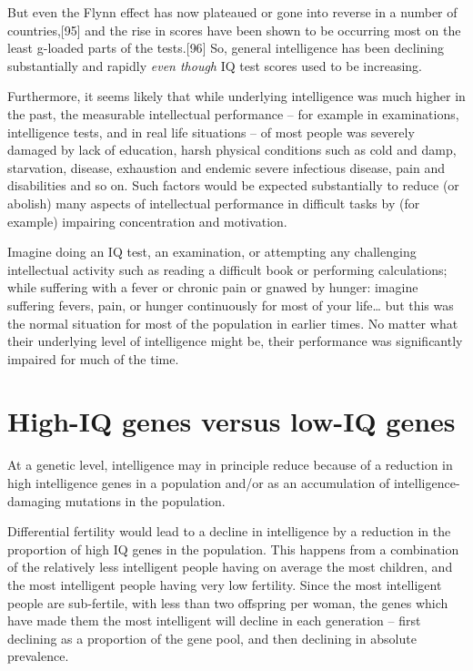 \documentclass[
]{book}
\begin{document}
But even the Flynn effect has now plateaued or gone into reverse in a number of countries,{[}95{]} and the rise in scores have been shown to be occurring most on the least g-loaded parts of the tests.{[}96{]} So, general intelligence has been declining substantially and rapidly \emph{even though} IQ test scores used to be increasing.

Furthermore, it seems likely that while underlying intelligence was much higher in the past, the measurable intellectual performance -- for example in examinations, intelligence tests, and in real life situations -- of most people was severely damaged by lack of education, harsh physical conditions such as cold and damp, starvation, disease, exhaustion and endemic severe infectious disease, pain and disabilities and so on. Such factors would be expected substantially to reduce (or abolish) many aspects of intellectual performance in difficult tasks by (for example) impairing concentration and motivation.

Imagine doing an IQ test, an examination, or attempting any challenging intellectual activity such as reading a difficult book or performing calculations; while suffering with a fever or chronic pain or gnawed by hunger: imagine suffering fevers, pain, or hunger continuously for most of your life\ldots{} but this was the normal situation for most of the population in earlier times. No matter what their underlying level of intelligence might be, their performance was significantly impaired for much of the time.

\hypertarget{high-iq-genes-versus-low-iq-genes}{%
\section{High-IQ genes versus low-IQ genes}\label{high-iq-genes-versus-low-iq-genes}}

At a genetic level, intelligence may in principle reduce because of a reduction in high intelligence genes in a population and/or as an accumulation of intelligence-damaging mutations in the population.

Differential fertility would lead to a decline in intelligence by a reduction in the proportion of high IQ genes in the population. This happens from a combination of the relatively less intelligent people having on average the most children, and the most intelligent people having very low fertility. Since the most intelligent people are sub-fertile, with less than two offspring per woman, the genes which have made them the most intelligent will decline in each generation -- first declining as a proportion of the gene pool, and then declining in absolute prevalence.
\end{document}
